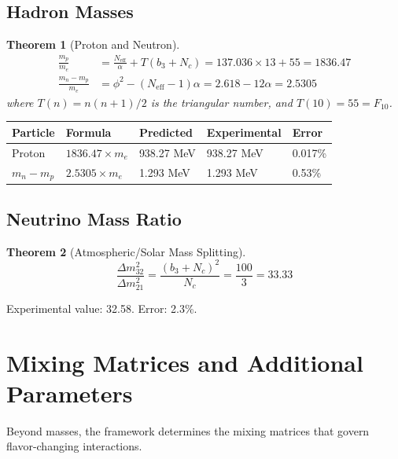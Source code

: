 \documentclass[11pt,a4paper]{article}
\newtheorem{theorem}{Theorem}[section]
\theoremstyle{definition}
\theoremstyle{remark}
\newcommand{\Neff}{N_{\text{eff}}}
\begin{document}
\subsection{Hadron Masses}

\begin{theorem}[Proton and Neutron]
\begin{align}
\frac{m_p}{m_e} &= \frac{\Neff}{\alpha} + T(b_3 + N_c) = 137.036 \times 13 + 55 = 1836.47 \\
\frac{m_n - m_p}{m_e} &= \phi^2 - (\Neff - 1)\alpha = 2.618 - 12\alpha = 2.5305
\end{align}
where $T(n) = n(n+1)/2$ is the triangular number, and $T(10) = 55 = F_{10}$.
\end{theorem}

\begin{center}
\begin{tabular}{lllll}
\toprule
Particle & Formula & Predicted & Experimental & Error \\
\midrule
Proton & $1836.47 \times m_e$ & 938.27 MeV & 938.27 MeV & 0.017\% \\
$m_n - m_p$ & $2.5305 \times m_e$ & 1.293 MeV & 1.293 MeV & 0.53\% \\
\bottomrule
\end{tabular}
\end{center}

\subsection{Neutrino Mass Ratio}

\begin{theorem}[Atmospheric/Solar Mass Splitting]
\begin{equation}
\frac{\Delta m_{32}^2}{\Delta m_{21}^2} = \frac{(b_3 + N_c)^2}{N_c} = \frac{100}{3} = 33.33
\end{equation}
\end{theorem}

Experimental value: 32.58. Error: 2.3\%.

\section{Mixing Matrices and Additional Parameters}

Beyond masses, the framework determines the mixing matrices that govern flavor-changing interactions.
\end{document}
